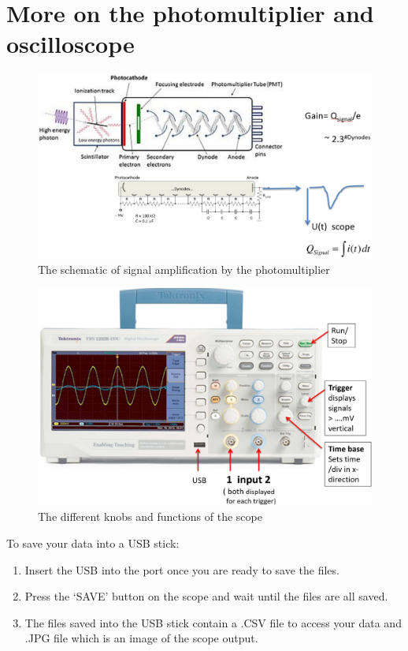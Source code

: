 \documentclass[10pt,aps,twocolumn,secnumarabic,balancelastpage,amsmath,amssymb,nofootinbib,floatfix]{revtex4}
\begin{document}
\clearpage
\appendix
\section{More on the photomultiplier and oscilloscope}

\begin{figure}
  \centering
  \includegraphics[width=1.0\linewidth]{figs/photomultipliertube.png}
  \caption{The schematic of signal amplification by the photomultiplier}
  \label{fig:photomultiplier-tube}
\end{figure}

\begin{figure}
  \centering
  \includegraphics[width=1.0\linewidth]{figs/morescope.png}
  \caption{The different knobs and functions of the scope}
  \label{fig:morescope}
\end{figure}

To save your data into a USB stick:
\begin{enumerate}
\item Insert the USB into the port once you are ready to save the files. 
\item Press the `SAVE' button on the scope and wait until the files are all saved. 
\item The files saved into the USB stick contain a .CSV file to access your data and .JPG file which is an image of the scope output. 
\end{enumerate}
\end{document}
